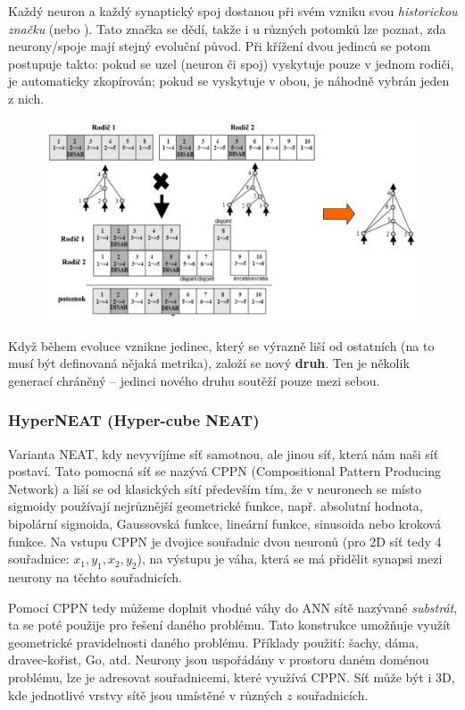 Každý neuron a každý synaptický spoj dostanou při svém vzniku svou \textit{historickou značku} (nebo ). Tato značka se dědí, takže i u různých potomků lze poznat, zda neurony/spoje mají stejný evoluční původ. Při křížení dvou jedinců se potom postupuje takto: pokud se uzel (neuron či spoj) vyskytuje pouze v jednom rodiči, je automaticky zkopírován; pokud se vyskytuje v obou, je náhodně vybrán jeden z nich.
\begin{figure}[H]
	\includegraphics[width=\textwidth]{img/neat.png}
\end{figure}

Když během evoluce vznikne jedinec, který se výrazně liší od ostatních (na to musí být definovaná nějaká metrika), založí se nový \textbf{druh}. Ten je několik generací chráněný -- jedinci nového druhu soutěží pouze mezi sebou.

\subsubsection{HyperNEAT (Hyper-cube NEAT)}
Varianta NEAT, kdy nevyvíjíme síť samotnou, ale jinou síť, která nám naši síť postaví. Tato pomocná síť se nazývá CPPN (Compositional Pattern Producing Network) a liší se od klasických sítí především tím, že v neuronech se místo sigmoidy používají nejrůznější geometrické funkce, např. absolutní hodnota, bipolární sigmoida, Gaussovská funkce, lineární funkce, sinusoida nebo kroková funkce. Na vstupu CPPN je dvojice souřadnic dvou neuronů (pro 2D síť tedy 4 souřadnice: $x_1, y_1, x_2, y_2$), na výstupu je váha, která se má přidělit synapsi mezi neurony na těchto souřadnicích.

Pomocí CPPN tedy můžeme doplnit vhodné váhy do ANN sítě nazývané \textit{substrát}, ta se poté použije pro řešení daného problému. Tato konstrukce umožňuje využít geometrické pravidelnosti daného problému. Příklady použití: šachy, dáma, dravec-kořist, Go, atd. Neurony jsou uspořádány v prostoru daném doménou problému, lze je adresovat souřadnicemi, které využívá CPPN. Síť může být i 3D, kde jednotlivé vrstvy sítě jsou umístěné v různých $z$ souřadnicích.

